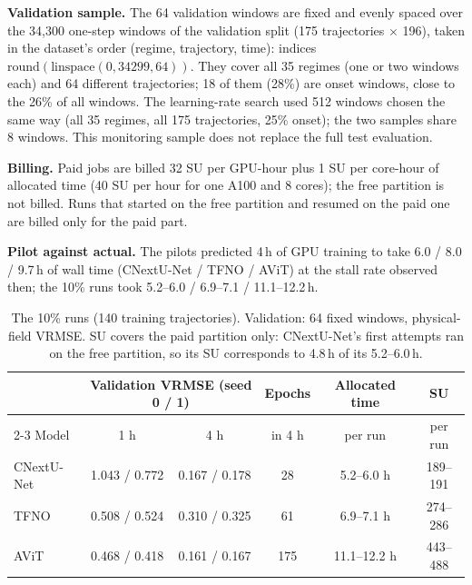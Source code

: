 \documentclass[11pt]{article}
\begin{document}
\textbf{Validation sample.} The 64 validation windows are fixed and evenly spaced over the 34,300 one-step windows
of the validation split (175 trajectories $\times$ 196), taken in the dataset's order (regime, trajectory, time):
indices $\mathrm{round}(\mathrm{linspace}(0, 34299, 64))$. They cover all 35 regimes (one or two windows each) and
64 different trajectories; 18 of them (28\%) are onset windows, close to the 26\% of all windows. The learning-rate
search used 512 windows chosen the same way (all 35 regimes, all 175 trajectories, 25\% onset); the two samples
share 8 windows. This monitoring sample does not replace the full test evaluation.

\textbf{Billing.} Paid jobs are billed 32 SU per GPU-hour plus 1 SU per core-hour of allocated time (40 SU per
hour for one A100 and 8 cores); the free partition is not billed. Runs that started on the free partition and
resumed on the paid one are billed only for the paid part.

\textbf{Pilot against actual.} The pilots predicted 4\,h of GPU training to take 6.0 / 8.0 / 9.7\,h of wall time
(CNextU-Net / TFNO / AViT) at the stall rate observed then; the 10\% runs took 5.2--6.0 / 6.9--7.1 /
11.1--12.2\,h.

\begin{table}[!htbp]
\centering\small
\begin{tabular}{@{}lccccc@{}}
\toprule
& \multicolumn{2}{c}{Validation VRMSE (seed 0 / 1)} & Epochs & Allocated time & SU \\
\cmidrule(lr){2-3}
Model & 1 h & 4 h & in 4 h & per run & per run \\
\midrule
CNextU-Net & 1.043 / 0.772 & 0.167 / 0.178 & 28 & 5.2--6.0 h & 189--191 \\
TFNO & 0.508 / 0.524 & 0.310 / 0.325 & 61 & 6.9--7.1 h & 274--286 \\
AViT & 0.468 / 0.418 & 0.161 / 0.167 & 175 & 11.1--12.2 h & 443--488 \\
\bottomrule
\end{tabular}
\caption{The 10\% runs (140 training trajectories). Validation: 64 fixed windows, physical-field VRMSE. SU covers
the paid partition only: CNextU-Net's first attempts ran on the free partition, so its SU corresponds to 4.8\,h
of its 5.2--6.0\,h.}
\label{tab:train}
\end{table}
\end{document}
